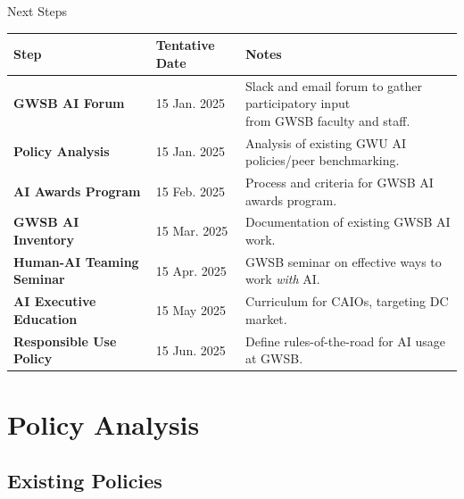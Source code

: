 \documentclass[aspectratio=169]{beamer}
\begin{document}
\begin{frame}{Next Steps}

    \begin{table}[h!]
    \centering
    \begin{tabular}{|l|l|l|}
    \hline
    \textbf{Step} & \textbf{Tentative Date}  & \textbf{Notes}  \\ \hline
    \textbf{GWSB AI Forum} & 15 Jan. 2025 & \makecell[l]{\tiny{Slack and email forum to gather participatory input}\\[-3pt]\tiny{from GWSB faculty and staff}.} \\ \hline
    \textbf{Policy Analysis} & 15 Jan. 2025 & \tiny{Analysis of existing GWU AI policies/peer benchmarking.} \\ \hline
    \textbf{AI Awards Program} & 15 Feb. 2025 & \tiny{Process and criteria for GWSB AI awards program.} \\ \hline
    \textbf{GWSB AI Inventory} & 15 Mar. 2025 & \tiny{Documentation of existing GWSB AI work.} \\ \hline
    \textbf{Human-AI Teaming Seminar} & 15 Apr. 2025 & \tiny{GWSB seminar on effective ways to work \textit{with} AI.} \\ \hline
    \textbf{AI Executive Education} & 15 May 2025 & \tiny{Curriculum for CAIOs, targeting DC market.} \\ \hline
    \textbf{Responsible Use Policy} & 15 Jun. 2025 & \tiny{Define rules-of-the-road for AI usage at GWSB.} \\ \hline
    \end{tabular}
    \end{table}

\end{frame}

\section{Policy Analysis}

\subsection*{Existing Policies}
\end{document}
